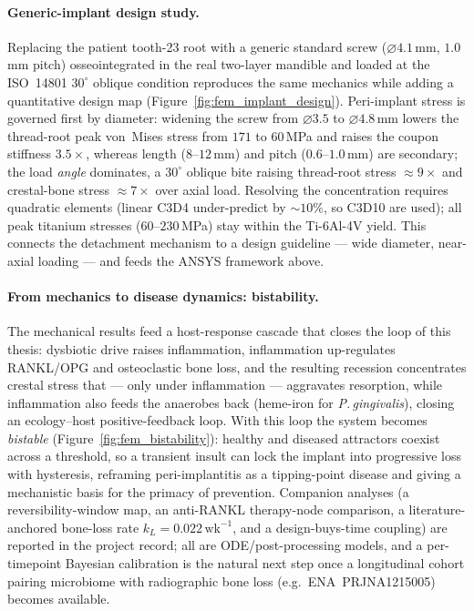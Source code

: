 \paragraph{Generic-implant design study.} Replacing the patient tooth-23 root with a generic standard
screw ($\varnothing 4.1$\,mm, $1.0$\,mm pitch) osseointegrated in the real two-layer mandible and loaded
at the ISO~14801 $30^\circ$ oblique condition reproduces the same mechanics while adding a quantitative
design map (Figure~\ref{fig:fem_implant_design}). Peri-implant stress is governed first by diameter:
widening the screw from $\varnothing 3.5$ to $\varnothing 4.8$\,mm lowers the thread-root peak von~Mises
stress from $171$ to $60$\,MPa and raises the coupon stiffness $3.5\times$, whereas length
($8$--$12$\,mm) and pitch ($0.6$--$1.0$\,mm) are secondary; the load \emph{angle} dominates, a $30^\circ$
oblique bite raising thread-root stress $\approx\!9\times$ and crestal-bone stress $\approx\!7\times$ over
axial load. Resolving the concentration requires quadratic elements (linear C3D4 under-predict by
$\sim\!10\%$, so C3D10 are used); all peak titanium stresses ($60$--$230$\,MPa) stay within the
Ti-6Al-4V yield. This connects the detachment mechanism to a design guideline --- wide diameter,
near-axial loading --- and feeds the ANSYS framework above.

\paragraph{From mechanics to disease dynamics: bistability.} The mechanical results feed a host-response
cascade that closes the loop of this thesis: dysbiotic drive raises inflammation, inflammation
up-regulates RANKL/OPG and osteoclastic bone loss, and the resulting recession concentrates crestal
stress that --- only under inflammation --- aggravates resorption, while inflammation also feeds the
anaerobes back (heme-iron for \emph{P.\,gingivalis}), closing an ecology--host positive-feedback loop.
With this loop the system becomes \emph{bistable} (Figure~\ref{fig:fem_bistability}): healthy and
diseased attractors coexist across a threshold, so a transient insult can lock the implant into
progressive loss with hysteresis, reframing peri-implantitis as a tipping-point disease and giving a
mechanistic basis for the primacy of prevention. Companion analyses (a reversibility-window map, an
anti-RANKL therapy-node comparison, a literature-anchored bone-loss rate $k_L=0.022\,\mathrm{wk}^{-1}$,
and a design-buys-time coupling) are reported in the project record; all are ODE/post-processing models,
and a per-timepoint Bayesian calibration is the natural next step once a longitudinal cohort pairing
microbiome with radiographic bone loss (e.g.\ ENA~PRJNA1215005) becomes available.


